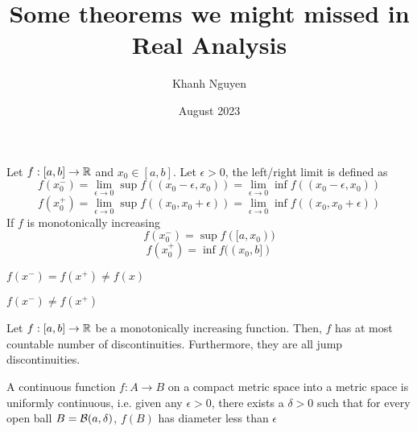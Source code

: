 \documentclass{article}
\title{
    Some theorems we might missed in Real Analysis
}
\author{Khanh Nguyen}
\date{August 2023}
\begin{document}
\maketitle

\begin{definition}
    Let $f: [a, b] \to \mathbb{R}$ and $x_0 \in [a, b]$. Let $\epsilon > 0$, the left/right limit is defined as
    $$
        f(x_0^-) = \lim_{\epsilon \to 0} \sup f((x_0 - \epsilon, x_0)) = \lim_{\epsilon \to 0} \inf f((x_0 - \epsilon, x_0))
    $$
    $$
        f(x_0^+) = \lim_{\epsilon \to 0} \sup f((x_0, x_0 + \epsilon)) = \lim_{\epsilon \to 0} \inf f((x_0, x_0 + \epsilon))
    $$
    If $f$ is monotonically increasing
    $$
        f(x_0^-) = \sup f([a, x_0))
    $$
    $$
        f(x_0^+) = \inf f((x_0, b])
    $$
\end{definition}

\begin{definition}
    $f(x^-) = f(x^+) \neq f(x)$
\end{definition}

\begin{definition}
    $f(x^-) \neq f(x^+)$
\end{definition}

\begin{theorem}
    Let $f: [a, b] \to \mathbb{R}$ be a monotonically increasing function. Then, $f$ has at most countable number of discontinuities. Furthermore, they are all jump discontinuities.
\end{theorem}

\begin{theorem}
    A continuous function $f: A \to B$ on a compact metric space into a metric space is uniformly continuous, i.e. given any $\epsilon > 0$, there exists a $\delta > 0$ such that for every open ball $B = \mathcal{B}(a, \delta)$, $f(B)$ has diameter less than $\epsilon$
\end{theorem}
\end{document}
